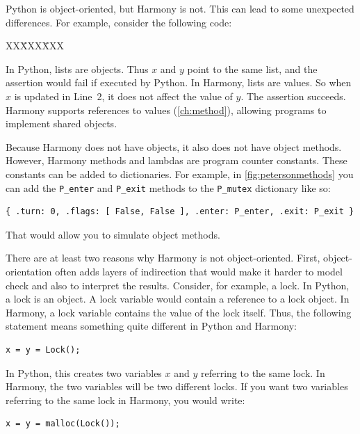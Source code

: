 \documentclass{report}
\newcommand{\harmonysource}[1]{
\begin{tabbing}
XX\=XXX\=XXX\kill
    
\end{tabbing}
}
\newenvironment{code}{
\tcolorbox
}{
\endtcolorbox
}
\begin{document}
Python is object-oriented, but Harmony is not.  This can lead to some
unexpected differences.  For example, consider the following code:

\begin{code}
\harmonysource{oo}
\end{code}

In Python, lists are objects.  Thus $x$ and $y$ point to the same list,
and the assertion would fail if executed by Python.
In Harmony, lists are values.  So when $x$ is updated in Line~2, it does
not affect the value of $y$.  The assertion succeeds.
Harmony supports references to values (\autoref{ch:method}),
allowing programs to implement shared objects.

Because Harmony does not have objects, it also does not have object methods.
However, Harmony methods and lambdas are program counter constants.
These constants can be added to dictionaries.
For example, in \autoref{fig:petersonmethods}
you can add the \texttt{P\_enter} and
\texttt{P\_exit} methods to the \texttt{P\_mutex} dictionary
like so:
\begin{code}
\begin{verbatim}
{ .turn: 0, .flags: [ False, False ], .enter: P_enter, .exit: P_exit }
\end{verbatim}
\end{code}
That would allow you to simulate object methods.

There are at least two reasons why Harmony is not object-oriented.
First,
object-orientation often adds layers of indirection that would make it
harder to model check and also to interpret the results.  Consider, for example,
a lock.  In Python, a lock is an object.  A lock variable would contain a
reference to a lock object.  In Harmony, a lock variable contains the value
of the lock itself.
Thus, the following statement means something quite different in Python and
Harmony:

\begin{code}
\begin{verbatim}
x = y = Lock();
\end{verbatim}
\end{code}

In Python, this creates two variables $x$ and $y$ referring to the same lock.
In Harmony, the two variables will be two different locks.  If you want two
variables referring to the same lock in Harmony, you would write:

\begin{code}
\begin{verbatim}
x = y = malloc(Lock());
\end{verbatim}
\end{code}
\end{document}
